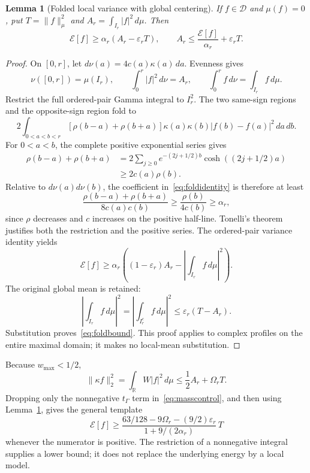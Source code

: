 \documentclass[11pt,a4paper]{article}
\numberwithin{equation}{section}
\newtheorem{lemma}[theorem]{Lemma}
\theoremstyle{remark}
\newcommand{\R}{\mathbb R}
\newcommand{\E}{\mathcal E}
\newcommand{\D}{\mathcal D}
\newcommand{\tg}{t_{\Gamma}}
\newcommand{\norm}[1]{\lVert #1\rVert}
\begin{document}
\begin{lemma}[Folded local variance with global centering]\label{lem:fold}
If $f\in\D$ and $\mu(f)=0$, put $T=\norm f_\mu^2$ and
$A_r=\int_{I_r}|f|^2\,d\mu$. Then
\begin{equation}\label{eq:foldbound}
 \E[f]\ge\alpha_r(A_r-\varepsilon_rT),\qquad
 A_r\le\frac{\E[f]}{\alpha_r}+\varepsilon_rT.
\end{equation}
\end{lemma}
\begin{proof}
On $[0,r]$, let $d\nu(a)=4c(a)\kappa(a)\,da$. Evenness gives
\[
 \nu([0,r])=\mu(I_r),\qquad
 \int_0^r|f|^2\,d\nu=A_r,\qquad
 \int_0^rf\,d\nu=\int_{I_r}f\,d\mu.
\]
Restrict the full ordered-pair Gamma integral to $I_r^2$. The two same-sign regions and the opposite-sign region fold to
\begin{equation}\label{eq:foldidentity}
 2\int_{0<a<b<r}[\rho(b-a)+\rho(b+a)]
       \kappa(a)\kappa(b)|f(b)-f(a)|^2\,da\,db.
\end{equation}
For $0<a<b$, the complete positive exponential series gives
\begin{align*}
 \rho(b-a)+\rho(b+a)
 &=2\sum_{j\ge0}e^{-(2j+1/2)b}\cosh((2j+1/2)a)\\
 &\ge2c(a)\rho(b).
\end{align*}
Relative to $d\nu(a)d\nu(b)$, the coefficient in~\eqref{eq:foldidentity} is therefore at least
\[
 \frac{\rho(b-a)+\rho(b+a)}{8c(a)c(b)}
 \ge\frac{\rho(b)}{4c(b)}\ge\alpha_r,
\]
since $\rho$ decreases and $c$ increases on the positive half-line. Tonelli's theorem justifies both the restriction and the positive series. The ordered-pair variance identity yields
\[
 \E[f]\ge\alpha_r\left((1-\varepsilon_r)A_r
                  -\left|\int_{I_r}f\,d\mu\right|^2\right).
\]
The original global mean is retained:
\[
 \left|\int_{I_r}f\,d\mu\right|^2
 =\left|\int_{I_r^c}f\,d\mu\right|^2
 \le\varepsilon_r(T-A_r).
\]
Substitution proves~\eqref{eq:foldbound}. This proof applies to complex profiles on the entire maximal domain; it makes no local-mean substitution.
\end{proof}

Because $w_{\max}<1/2$,
\begin{equation}\label{eq:masswindow}
 \norm{\kappa f}_2^2=\int_\R W|f|^2\,d\mu
 \le\frac12A_r+\Omega_rT.
\end{equation}
Dropping only the nonnegative $\tg$ term in~\eqref{eq:masscontrol}, and then using Lemma~\ref{lem:fold}, gives the general template
\begin{equation}\label{eq:seedtemplate}
 \E[f]\ge
 \frac{63/128-9\Omega_r-(9/2)\varepsilon_r}
      {1+9/(2\alpha_r)}\,T
\end{equation}
whenever the numerator is positive. The restriction of a nonnegative integral supplies a lower bound; it does not replace the underlying energy by a local model.
\end{document}
